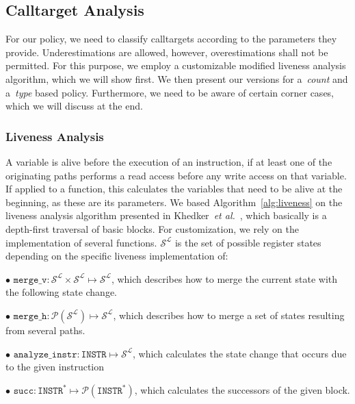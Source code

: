     
\subsection{Calltarget Analysis}
\label{section:calltargetanalysis}
For our policy, we need to classify calltargets according to the parameters they provide. Underestimations are allowed, however, overestimations 
shall not be permitted. For this purpose, we employ a customizable modified liveness analysis algorithm, which we will show first. 
We then present our versions for a~\emph{count} and a~\emph{type} based policy. Furthermore, we need to be aware of certain corner cases,
which we will discuss at the end.

\subsubsection{Liveness Analysis}
A variable is alive before the execution of an instruction, if at least one of the originating paths performs a read access before any write access on that variable. 
If applied to a function, this calculates the variables that need to be alive at the beginning, as these are its parameters. We based Algorithm~\ref{alg:liveness} 
on the liveness analysis algorithm presented in Khedker~\textit{et al.}~\cite{khedker2009data}, which basically is a depth-first traversal of basic blocks. 
For customization, we rely on the implementation of several functions. $\mathcal{S}^\mathcal{L}$ is the set of possible register states depending on the specific liveness implementation of:

$\bullet$ $\texttt{merge\_v} : \mathcal{S}^\mathcal{L} \times \mathcal{S}^\mathcal{L} \mapsto \mathcal{S}^\mathcal{L}$, which describes how to merge the current state with the following state change.

$\bullet$ $\texttt{merge\_h} : \mathcal{P}(\mathcal{S}^\mathcal{L}) \mapsto \mathcal{S}^\mathcal{L}$, which describes how to merge a set of states resulting from several paths.

$\bullet$ $\texttt{analyze\_instr} : \texttt{INSTR} \mapsto \mathcal{S}^\mathcal{L}$, which calculates the state change that occurs due to the given instruction 

$\bullet$ $\texttt{succ} : \texttt{INSTR}^* \mapsto \mathcal{P}(\texttt{INSTR}^*)$, which calculates the successors of the given block.

